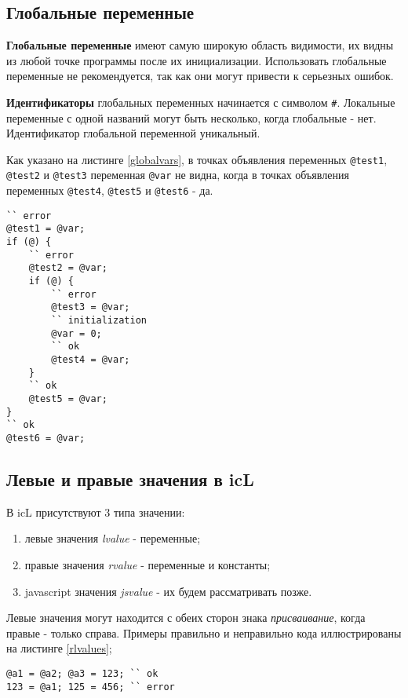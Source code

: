 \documentclass[a4paper, 14pt, russian]{extarticle}
\newenvironment{icEnum}
	{ \begin{enumerate}[noitemsep,nolistsep] }
	{ \end{enumerate} }
\begin{document}
\subsection{Глобальные переменные}

	\textbf{Глобальные переменные} имеют самую широкую область видимости, их видны из любой точке программы после их инициализации. Использовать глобальные переменные не рекомендуется, так как они могут привести к серьезных ошибок. 
	
	{\bf Идентификаторы} глобальных переменных начинается с символом {\color{blue2}\lstinline`#`}. Локальные переменные с одной названий могут быть несколько, когда глобальные - нет. Идентификатор глобальной переменной уникальный.
	
	Как указано на листинге \ref{globalvars}, в точках объявления переменных \lstinline`@test1`, \lstinline`@test2` и \lstinline`@test3` переменная \lstinline`@var` не видна, когда в точках объявления переменных \lstinline`@test4`, \lstinline`@test5` и \lstinline`@test6` - да.
	
\begin{lstlisting}[caption=Область видимости глобальных перемен, label=globalvars]
`` error
@test1 = @var;
if (@) {
	`` error
	@test2 = @var; 
	if (@) {
		`` error
		@test3 = @var;
		`` initialization
		@var = 0;
		`` ok
		@test4 = @var;
	}
	`` ok
	@test5 = @var; 
}
`` ok
@test6 = @var;
\end{lstlisting}

\subsection{Левые и правые значения в icL}

	В icL присутствуют 3 типа значении:
\begin{icEnum}
	\item левые значения {\it lvalue} - переменные;
	\item правые значения {\it rvalue} - переменные и константы;
	\item javascript значения {\it jsvalue} - их будем рассматривать позже.
\end{icEnum}
	
	Левые значения могут находится с обеих сторон знака {\it присваивание}, когда правые - только справа. Примеры правильно и неправильно кода иллюстрированы на листинге \ref{rlvalues};
\begin{lstlisting}[caption=Левые и правые значения, label=rlvalues]
@a1 = @a2; @a3 = 123; `` ok
123 = @a1; 125 = 456; `` error 
\end{lstlisting}
\end{document}
